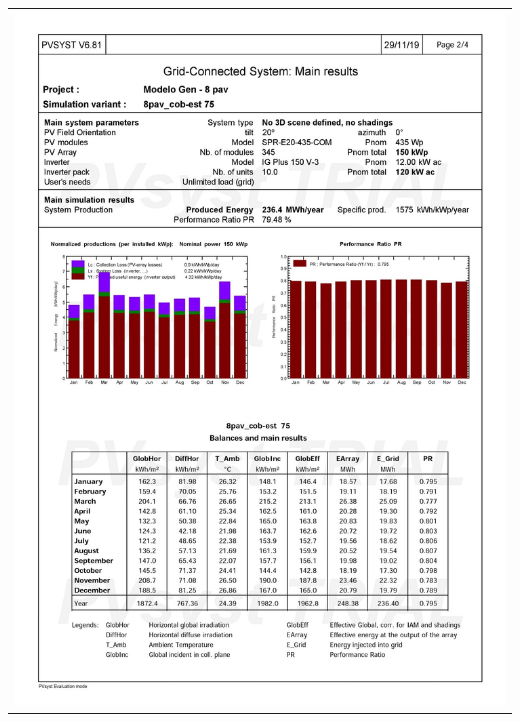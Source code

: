 \begin{table}[H]
    \centering
    \begin{tabular}{l}
        \includegraphics[width=\textwidth]{figures/attachments/resultpv2.jpg}
    \end{tabular}
\end{table}
\pagebreak
